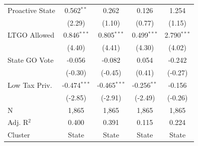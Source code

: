 \begin{tabular*}{\textwidth}{@{\extracolsep{\fill}}lcccc}
   Proactive State      & 0.562$^{**}$              & 0.262                         & 0.126                                & 1.254\\   
                        & (2.29)                   & (1.10)                       & (0.77)                              & (1.15)\\   
   LTGO Allowed         & 0.846$^{***}$             & 0.805$^{***}$                 & 0.499$^{***}$                        & 2.790$^{***}$\\   
                        & (4.40)                   & (4.41)                       & (4.30)                              & (4.02)\\   
   State GO Vote        & -0.056                    & -0.082                        & 0.054                                & -0.242\\   
                        & (-0.30)                  & (-0.45)                      & (0.41)                              & (-0.27)\\   
   Low Tax Priv.        & -0.474$^{***}$            & -0.465$^{***}$                & -0.256$^{**}$                        & -0.156\\   
                        & (-2.85)                  & (-2.91)                      & (-2.49)                             & (-0.26)\\   
   \hline
   N         & 1,865                     & 1,865                         & 1,865                                & 1,865\\  
   Adj. R$^2$       & 0.400                     & 0.391                         & 0.115                                & 0.224\\  
   Cluster              & State & State & State & State\\  
   \bottomrule
\end{tabular*}
\par\endgroup
